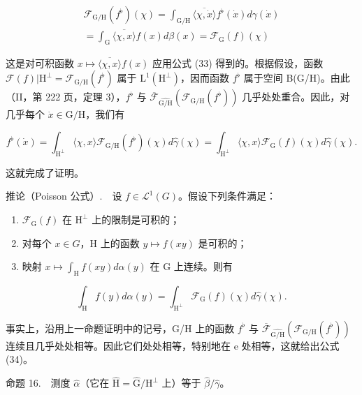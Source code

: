 \[
\begin{array}{r} \mathcal {F} _ {\mathrm{G/H}} (f ^ {\flat}) (\chi) = \int_ {\mathrm{G/H}} \overline {{\langle \chi , \dot {x} \rangle}} f ^ {\flat} (\dot {x}) d \gamma (\dot {x}) \\ = \int_ {\mathrm{G}} \overline {{\langle \chi , x \rangle}} f (x) d \beta (x) = \mathcal {F} _ {\mathrm{G}} (f) (\chi) \end{array}
\]

这是对可积函数 \(x \mapsto \overline{\langle\chi, x\rangle} f(x)\) 应用公式 (33) 得到的。根据假设，函数 \(\mathcal{F}(f)|\mathrm{H}^{\perp} = \mathcal{F}_{\mathrm{G}/\mathrm{H}}(f^{\flat})\) 属于 \(\mathrm{L}^{1}(\mathrm{H}^{\perp})\)，因而函数 \(f^{\flat}\) 属于空间 B(G/H)。由此（II，第 222 页，定理 3），\(f^{\flat}\) 与 \(\overline{\mathcal{F}}_{\widehat{\mathrm{G / H}}}(\mathcal{F}_{\mathrm{G / H}}(f^{\flat}))\) 几乎处处重合。因此，对几乎每个 \(\dot{x}\in \mathrm{G / H}\)，我们有

\[
f ^ {\flat} (\dot {x}) = \int_ {\mathrm{H} ^ {\perp}} \langle \chi , x \rangle \mathcal {F} _ {\mathrm{G/H}} (f ^ {\flat}) (\chi) d \widehat {\gamma} (\chi) = \int_ {\mathrm{H} ^ {\perp}} \langle \chi , x \rangle \mathcal {F} _ {\mathrm{G}} (f) (\chi) d \widehat {\gamma} (\chi).
\]

这就完成了证明。

推论（Poisson 公式）.　设 \(f \in \mathcal{L}^{1}(G)\)。假设下列条件满足：

\begin{enumerate}
\def\labelenumi{(\roman{enumi})}
\item
  \(\mathcal{F}_{\mathrm{G}}(f)\) 在 \(\mathrm{H}^{\perp}\) 上的限制是可积的；
\item
  对每个 \(x \in G\)，H 上的函数 \(y \mapsto f(xy)\) 是可积的；
\item
  映射 \(x\mapsto \int_{\mathrm{H}}f(xy)d\alpha (y)\) 在 G 上连续。则有
\end{enumerate}

\[
\int_ {\mathrm{H}} f (y) d \alpha (y) = \int_ {\mathrm{H} ^ {\perp}} \mathcal {F} _ {\mathrm{G}} (f) (\chi) d \widehat {\gamma} (\chi).\tag{34}
\]

事实上，沿用上一命题证明中的记号，G/H 上的函数 \(f^{\flat}\) 与 \(\overline{\mathcal{F}}_{\widehat{\mathrm{G/H}}}\left(\mathcal{F}_{\mathrm{G/H}}(f^{\flat})\right)\) 连续且几乎处处相等。因此它们处处相等，特别地在 e 处相等，这就给出公式 (34)。

命题 16.　测度 \(\widehat{\alpha}\)（它在 \(\widehat{\mathrm{H}} = \widehat{\mathrm{G}} / \mathrm{H}^{\perp}\) 上）等于 \(\widehat{\beta} / \widehat{\gamma}\)。

